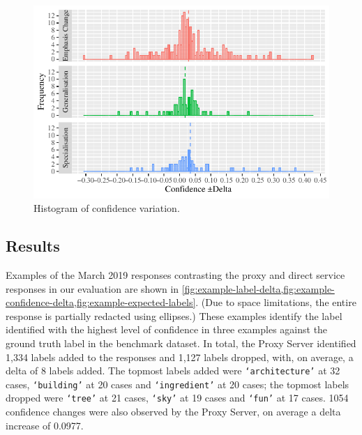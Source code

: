 \begin{figure}[t]
    \centering
    \includegraphics[width=\linewidth]{frequency}
    \caption[Histogram of confidence variation]{Histogram of confidence variation.}
    \label{fig:frequency}
\end{figure}

\subsection{Results}
\label{fse2020:sec:eval:results}

Examples of the March 2019 responses contrasting the proxy and direct service responses in our evaluation are shown in \cref{fig:example-label-delta,fig:example-confidence-delta,fig:example-expected-labels}. (Due to space limitations, the entire  response is partially redacted using ellipses.) These examples identify the label identified with the highest level of confidence in three examples against the ground truth label in the benchmark dataset. In total, the Proxy Server identified 1,334 labels added to the responses and 1,127 labels dropped, with, on average, a delta of 8 labels added. The topmost labels added were \texttt{`architecture'} at 32 cases, \texttt{`building'} at 20 cases and \texttt{`ingredient'} at 20 cases; the topmost labels dropped were \texttt{`tree'} at 21 cases, \texttt{`sky'} at 19 cases and \texttt{`fun'} at 17 cases. 1054 confidence changes were also observed by the Proxy Server, on average a delta increase of 0.0977. 

